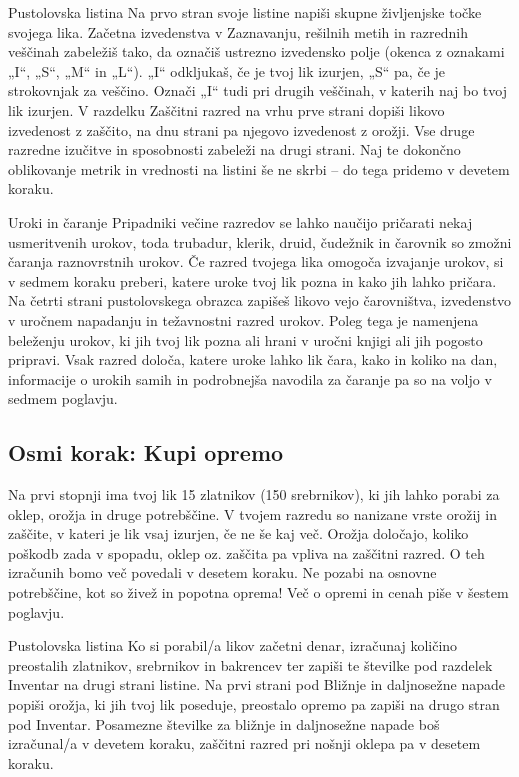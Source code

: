 \begin{rpg-titlebox}{Pustolovska listina}
    Na prvo stran svoje listine napiši skupne življenjske točke svojega lika. Začetna izvedenstva v Zaznavanju, rešilnih metih in razrednih veščinah zabeležiš tako, da označiš ustrezno izvedensko polje (okenca z oznakami „I“, „S“, „M“ in „L“). „I“ odkljukaš, če je tvoj lik izurjen, „S“ pa, če je strokovnjak za veščino. Označi „I“ tudi pri drugih veščinah, v katerih naj bo tvoj lik izurjen. V razdelku Zaščitni razred na vrhu prve strani dopiši likovo izvedenost z zaščito, na dnu strani pa njegovo izvedenost z orožji. Vse druge razredne izučitve in sposobnosti zabeleži na drugi strani. Naj te dokončno oblikovanje metrik in vrednosti na listini še ne skrbi -- do tega pridemo v devetem koraku.
\end{rpg-titlebox}

\begin{rpg-titlebox}{Uroki in čaranje}
    Pripadniki večine razredov se lahko naučijo pričarati nekaj usmeritvenih urokov, toda trubadur, klerik, druid, čudežnik in čarovnik so zmožni čaranja raznovrstnih urokov. Če razred tvojega lika omogoča izvajanje urokov, si v sedmem koraku preberi, katere uroke tvoj lik pozna in kako jih lahko pričara. Na četrti strani pustolovskega obrazca zapišeš likovo vejo čarovništva, izvedenstvo v uročnem napadanju in težavnostni razred urokov. Poleg tega je namenjena beleženju urokov, ki jih tvoj lik pozna ali hrani v uročni knjigi ali jih pogosto pripravi. Vsak razred določa, katere uroke lahko lik čara, kako in koliko na dan, informacije o urokih samih in podrobnejša navodila za čaranje pa so na voljo v sedmem poglavju.
\end{rpg-titlebox}

\subsection{Osmi korak: Kupi opremo}
Na prvi stopnji ima tvoj lik 15 zlatnikov (150 srebrnikov), ki jih lahko porabi za oklep, orožja in druge potrebščine. V tvojem razredu so nanizane vrste orožij in zaščite, v kateri je lik vsaj izurjen, če ne še kaj več. Orožja določajo, koliko poškodb zada v spopadu, oklep oz. zaščita pa vpliva na zaščitni razred. O teh izračunih bomo več povedali v desetem koraku. Ne pozabi na osnovne potrebščine, kot so živež in popotna oprema! Več o opremi in cenah piše v šestem poglavju.

\begin{rpg-titlebox}{Pustolovska listina}
    Ko si porabil/a likov začetni denar, izračunaj količino preostalih zlatnikov, srebrnikov in bakrencev ter zapiši te številke pod razdelek Inventar na drugi strani listine. Na prvi strani pod Bližnje in daljnosežne napade popiši orožja, ki jih tvoj lik poseduje, preostalo opremo pa zapiši na drugo stran pod Inventar. Posamezne številke za bližnje in daljnosežne napade boš izračunal/a v devetem koraku, zaščitni razred pri nošnji oklepa pa v desetem koraku.
\end{rpg-titlebox}

